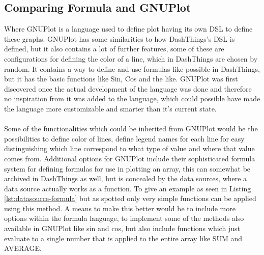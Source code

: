 \subsection{Comparing Formula and GNUPlot} 
\label{gnuplot}
Where GNUPlot is a language used to define
plot having its own DSL to define these graphs. GNUPlot has some similarities to how DashThings's
DSL is defined, but it also contains a lot of further features, some of these are configurations
for defining the color of a line, which in DashThings are chosen by random. It contains a way
to define and use formulas like possible in DashThings, but it has the basic functions like
Sin, Cos and the like. GNUPlot was first discovered once the actual development of the language
was done and therefore no inspiration from it was added to the language, which could possible have
made the language more customizable and smarter than it's current state.
\\
\\
Some of the functionalities which could be inherited from GNUPlot would be the possibilities to
define color of lines, define legend names for each line for easy distinguishing which line
correspond to what type of value and where that value comes from. Additional options for GNUPlot
include their sophisticated formula system for defining formulas for use in plotting an array,
this can somewhat be archived in DashThings as well, but is concealed by the data sources, where
a data source actually works as a function. To give an example as seen in Listing
\ref{lst:datasource-formula} but as spotted only very simple functions can be applied using
this method. A means to make this better would be to include more options within the formula
language, to implement some of the methods also available in GNUPlot like sin and cos, but also
include functions which just evaluate to a single number that is applied to the entire array
like SUM and AVERAGE.

